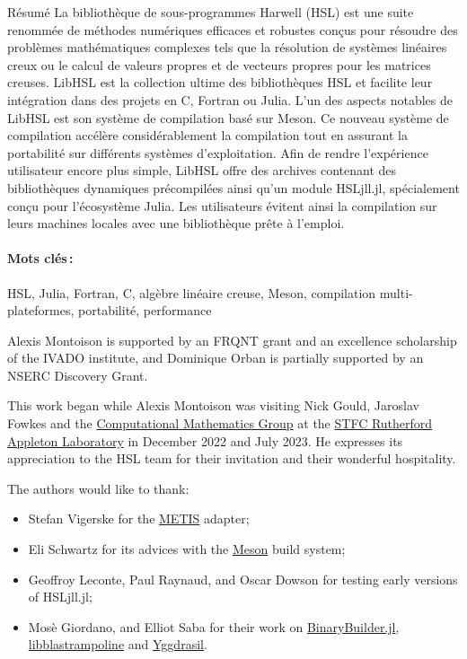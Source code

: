 \documentclass[gdweb]{geradwp}
\renewcommand{\_}{\raisebox{+0.35mm}{\textunderscore}}
\newcommand{\LibHSL}{LibHSL\xspace}
\newcommand{\HSLjll}{HSL\_jll.jl\xspace}
\begin{document}
\begin{GDabstract}{R\'esum\'e}
La bibliothèque de sous-programmes Harwell (HSL) est une suite renommée de méthodes numériques efficaces et robustes conçus pour résoudre des problèmes mathématiques complexes tels que la résolution de systèmes linéaires creux ou le calcul de valeurs propres et de vecteurs propres pour les matrices creuses.
\LibHSL est la collection ultime des bibliothèques HSL et facilite leur intégration dans des projets en C, Fortran ou Julia.
L'un des aspects notables de \LibHSL est son système de compilation basé sur Meson.
Ce nouveau système de compilation accélère considérablement la compilation tout en assurant la portabilité sur différents systèmes d'exploitation.
Afin de rendre l'expérience utilisateur encore plus simple, \LibHSL offre des archives contenant des bibliothèques dynamiques précompilées ainsi qu'un module \HSLjll, spécialement conçu pour l'écosystème Julia.
Les utilisateurs évitent ainsi la compilation sur leurs machines locales avec une bibliothèque prête à l'emploi.

\paragraph{Mots cl\'es\,: }
HSL, Julia, Fortran, C, alg\`ebre lin\'eaire creuse, Meson, compilation multi-plateformes, portabilit\'e, performance
\end{GDabstract}

\begin{GDacknowledgements}
Alexis Montoison is supported by an FRQNT grant and an excellence scholarship of the IVADO institute, and Dominique Orban is partially supported by an NSERC Discovery Grant.

This work began while Alexis Montoison was visiting Nick Gould, Jaroslav Fowkes and the \href{https://www.numerical.rl.ac.uk/}{Computational Mathematics Group} at the \href{https://www.ukri.org/about-us/stfc/locations/rutherford-appleton-laboratory/}{STFC Rutherford Appleton Laboratory} in December 2022 and July 2023.
He expresses its appreciation to the HSL team for their invitation and their wonderful hospitality.

The authors would like to thank:
\begin{itemize}
  \item Stefan Vigerske for the \href{https://github.com/KarypisLab/METIS}{METIS} adapter;
  \item Eli Schwartz for its advices with the \href{https://mesonbuild.com/}{Meson} build system;
  \item Geoffroy Leconte, Paul Raynaud, and Oscar Dowson for testing early versions of \HSLjll;
  \item Mosè Giordano, and Elliot Saba for their work on \href{https://github.com/JuliaPackaging/BinaryBuilder.jl}{BinaryBuilder.jl}, \href{https://github.com/JuliaLinearAlgebra/libblastrampoline}{libblastrampoline} and \href{https://github.com/JuliaPackaging/Yggdrasil}{Yggdrasil}.
\end{itemize}
\end{GDacknowledgements}
\end{document}
